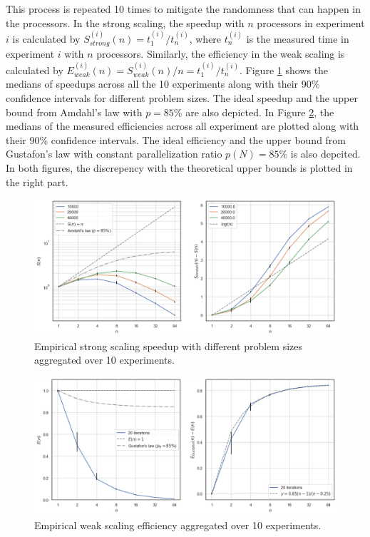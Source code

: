 \documentclass[10pt,journal,compsocconf]{IEEEtran}
\begin{document}
This process is repeated 10 times to mitigate the randomness that can happen in the processors. In the strong scaling, the speedup with $n$ processors in experiment $i$ is calculated by $S^{(i)}_{strong}(n) = t^{(i)}_1 / t^{(i)}_n$, where $t^{(i)}_n$ is the measured time in experiment $i$ with $n$ processors. Similarly, the efficiency in the weak scaling is calculated by $E^{(i)}_{weak}(n) = S^{(i)}_{weak}(n) / n = t^{(i)}_1 / t^{(i)}_n$. Figure \ref{fig:strongscaling} shows the medians of speedups across all the 10 experiments along with their 90\% confidence intervals for different problem sizes. The ideal speedup and the upper bound from Amdahl's law with $p=85\%$ are also depicted. In Figure \ref{fig:weakscaling}, the medians of the measured efficiencies across all experiment are plotted along with their 90\% confidence intervals. The ideal efficiency and the upper bound from Gustafon's law with constant parallelization ratio $p(N)=85\%$ is also depcited. In both figures, the discrepency with the theoretical upper bounds is plotted in the right part.

\begin{figure}[ht]
  \centering
  \includegraphics[width=.9\textwidth]{img/strongscaling.png}
  \caption{Empirical strong scaling speedup with different problem sizes aggregated over 10 experiments.}
  \label{fig:strongscaling}
\end{figure}

\begin{figure}[ht]
  \centering
  \includegraphics[width=.9\textwidth]{img/weakscaling.png}
  \caption{Empirical weak scaling efficiency aggregated over 10 experiments.}
  \label{fig:weakscaling}
\end{figure}
\end{document}
